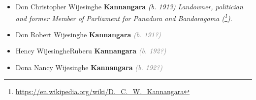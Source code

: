 \documentclass[10pt, openany]{book}
\begin{document}
\begin{itemize}
{\begin{itemize}
{\begin{itemize}
{\begin{itemize}
{\begin{itemize}
{\begin{itemize}
{\begin{itemize}
{\begin{itemize}
{ }
\end{itemize}}
\end{itemize}
  }
\item{Don Christopher Wijesinghe \textbf{Kannangara} \textcolor{slorange}{\textit{(b. 1913)}} \textcolor{slmaroon}{\textit{Landowner, politician and former Member of Parliament for Panadura and Bandaragama (\footnote{\url{https://en.wikipedia.org/wiki/D._C._W._Kannangara}}).}}
   }
\item{Don Robert Wijesinghe \textbf{Kannangara} \textcolor{gray}{\textit{(b. 191?)}}
   }
\item{Hency WijesingheRuberu \textbf{Kannangara} \textcolor{gray}{\textit{(b. 192?)}}
  }
\item{Dona Nancy Wijesinghe \textbf{Kannangara} \textcolor{gray}{\textit{(b. 192?)}}
   }
\end{itemize}}
\end{itemize}
    }
\end{itemize}}
\end{itemize}
   }
\end{itemize}}
\end{itemize}
    
\end{document}
